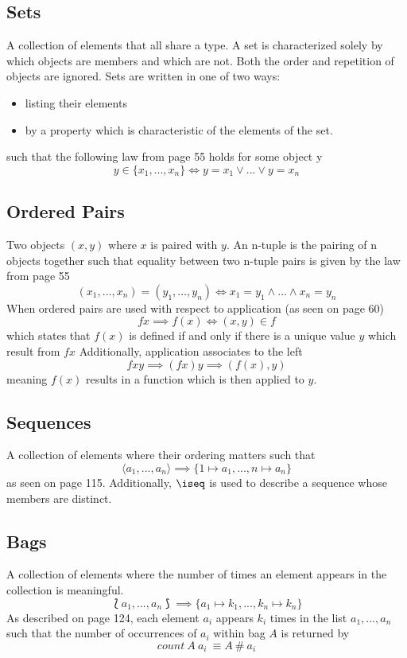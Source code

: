 \documentclass[../main.tex]{subfiles}
\begin{document}
\subsection{Sets}
A collection of elements that all share a type. A set is characterized solely by which objects are members and which are not.
Both the order and repetition of objects are ignored. Sets are written in one of two ways:
\begin{itemize}
\item listing their elements
\item by a property which is characteristic of the elements of the set.
\end{itemize}
such that the following law from page 55 holds for some object y
$$y \in \{x_{1},...,x_{n}\} \iff y = x_{1} \lor ... \lor y = x_{n}$$

\subsection{Ordered Pairs}
Two objects $(x, y)$ where $x$ is paired with $y$. An n-tuple is
the pairing of n objects together such that equality between two n-tuple pairs
is given by the law from page 55
$$(x_{1},...,x_{n}) = (y_{1},...,y_{n}) \iff x_{1} = y_{1} \land ... \land x_{n} = y_{n}$$
When ordered pairs are used with respect to application (as seen on page 60)
$$f x \implies f(x) \iff (x,y) \in f$$
which states that $f(x)$ is defined if and only if there is a unique value $y$ which result from $f x$
Additionally, application associates to the left
$$f x y \implies (f x) y \implies (f(x), y)$$
meaning $f(x)$ results in a function which is then applied to $y$.

\subsection{Sequences}
A collection of elements where their ordering matters such that
$$\langle a_{1},...,a_{n} \rangle \implies \{1 \mapsto a_{1}, ..., n \mapsto a_{n}\}$$
as seen on page 115. Additionally, $\iseq$ is used to describe a sequence whose members are distinct.

\subsection{Bags}
A collection of elements where the number of times an element appears in the collection is meaningful.
$$\lbag a_{1},...,a_{n} \rbag \implies \{a_{1} \mapsto k_{1},...,k_{n} \mapsto k_{n}\}$$
As described on page 124, each element $a_{i}$ appears $k_{i}$ times in the list $a_{1},...,a_{n}$
such that the number of occurrences of $a_{i}$ within bag $A$ is returned by
$$count ~A ~a_{i} \ \equiv A ~\# ~a_{i}$$
\end{document}
